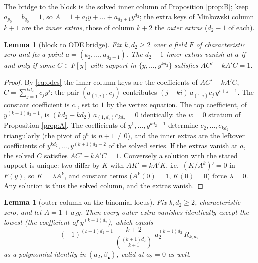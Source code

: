 \documentclass[11pt]{article}
\newtheorem{lemma}[theorem]{Lemma}
\theoremstyle{definition}
\theoremstyle{remark}
\begin{document}
The bridge to the block is the solved inner column of Proposition \ref{prop:B}; keep $a_{p_0}=b_{q_0}=1$, so $A=1+a_2y+\dots+a_{d_2+1}y^{d_2}$; the extra keys of Minkowski column $k+1$ are the \emph{inner extras}, those of column $k+2$ the \emph{outer extras} ($d_2-1$ of each).

\begin{lemma}[block to ODE bridge]\label{lem:bridge}
Fix $k,d_2\geq2$ over a field $F$ of characteristic zero and fix a point $a=(a_2,\dots,a_{d_2+1})$. The $d_2-1$ inner extras vanish at $a$ if and only if some $C\in F[y]$ with support in $\{y,\dots,y^{kd_2}\}$ satisfies $AC'-kA'C=1$.
\end{lemma}

\begin{proof}
By \eqref{eq:odes} the inner-column keys are the coefficients of $AC'-kA'C$, $C=\sum_{j=1}^{kd_2}c_jy^j$: the pair $(a_{(1,i)},c_j)$ contributes $(j-ki)\,a_{(1,i)}c_j\,y^{i+j-1}$. The constant coefficient is $c_1$, set to $1$ by the vertex equation. The top coefficient, of $y^{(k+1)d_2-1}$, is $(kd_2-kd_2)\,a_{(1,d_2)}c_{kd_2}=0$ identically: the $w=0$ stratum of Proposition \ref{prop:A}. The coefficients of $y^1,\dots,y^{kd_2-1}$ determine $c_2,\dots,c_{kd_2}$ triangularly (the pivot of $y^n$ is $n+1\neq0$), and the inner extras are the leftover coefficients of $y^{kd_2},\dots,y^{(k+1)d_2-2}$ of the solved series. If the extras vanish at $a$, the solved $C$ satisfies $AC'-kA'C=1$. Conversely a solution with the stated support is unique: two differ by $K$ with $AK'=kA'K$, i.e.\ $(K/A^k)'=0$ in $F(y)$, so $K=\lambda A^k$, and constant terms ($A^k(0)=1$, $K(0)=0$) force $\lambda=0$. Any solution is thus the solved column, and the extras vanish.
\end{proof}

\begin{lemma}[outer column on the binomial locus]\label{lem:outer}
Fix $k,d_2\geq2$, characteristic zero, and let $A=1+a_2y$. Then every outer extra vanishes identically except the lowest (the coefficient of $y^{(k+1)d_2}$), which equals
\[
(-1)^{(k+1)d_2-1}\,\frac{k+2}{\binom{(k+1)d_2}{k+1}}\;a_2^{(k-1)d_2}\,R_{k,d_2}
\]
as a polynomial identity in $(a_2,\beta_\bullet)$, valid at $a_2=0$ as well.
\end{lemma}
\end{document}
